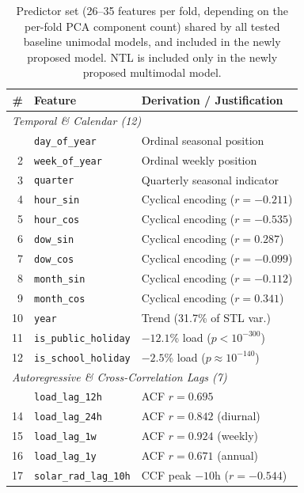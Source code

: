 \begin{table}[htbp]
\centering
\caption{Predictor set (26--35 features per fold, depending on the per-fold
PCA component count) shared by all tested baseline unimodal models, and
included in the newly proposed model. NTL is included only in the newly
proposed multimodal model.}
\label{tab:36_features}
\footnotesize
\begin{tabularx}{\columnwidth}{r l X}
\toprule
\textbf{\#} & \textbf{Feature} & \textbf{Derivation / Justification} \\
\midrule
\multicolumn{3}{l}{\textit{Temporal \& Calendar (12)}} \\
\addlinespace[2pt]
1  & \texttt{day\_of\_year}       & Ordinal seasonal position \\
2  & \texttt{week\_of\_year}      & Ordinal weekly position \\
3  & \texttt{quarter}             & Quarterly seasonal indicator \\
4  & \texttt{hour\_sin}           & Cyclical encoding ($r = -0.211$) \\
5  & \texttt{hour\_cos}           & Cyclical encoding ($r = -0.535$) \\
6  & \texttt{dow\_sin}            & Cyclical encoding ($r = 0.287$) \\
7  & \texttt{dow\_cos}            & Cyclical encoding ($r = -0.099$) \\
8  & \texttt{month\_sin}          & Cyclical encoding ($r = -0.112$) \\
9  & \texttt{month\_cos}          & Cyclical encoding ($r = 0.341$) \\
10 & \texttt{year}                & Trend (31.7\% of STL var.) \\
11 & \texttt{is\_public\_holiday} & $-12.1$\% load ($p < 10^{-300}$) \\
12 & \texttt{is\_school\_holiday} & $-2.5$\% load ($p \approx 10^{-140}$) \\
\midrule
\multicolumn{3}{l}{\textit{Autoregressive \& Cross-Correlation Lags (7)}} \\
\addlinespace[2pt]
13 & \texttt{load\_lag\_12h}        & ACF $r = 0.695$ \\
14 & \texttt{load\_lag\_24h}        & ACF $r = 0.842$ (diurnal) \\
15 & \texttt{load\_lag\_1w}         & ACF $r = 0.924$ (weekly) \\
16 & \texttt{load\_lag\_1y}         & ACF $r = 0.671$ (annual) \\
17 & \texttt{solar\_rad\_lag\_10h}  & CCF peak $-10$h ($r = -0.544$) \\

\end{tabularx}
\end{table}
